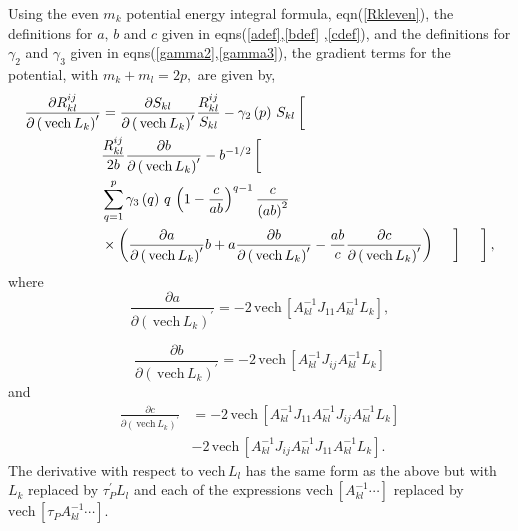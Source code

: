 \documentclass[12pt]{article}
\begin{document}
Using the even $m_{k}$ potential energy integral formula, eqn(\ref{Rkleven}),
the definitions for $a,\,b$ and $c$ given in eqns(\ref{adef},\ref{bdef}%
,\ref{cdef}), and the definitions for $\gamma_{2}$ and $\gamma_{3}$ given in
eqns(\ref{gamma2},\ref{gamma3}), the gradient terms for the potential, with
$m_{k}+m_{l}=2p,$ are given by,
\begin{align}
\frac{\partial R_{kl}^{ij}}{\partial\left(  \,\mathrm{vech}\,L_{k}\right)
^{\prime}} &  =\frac{\partial S_{kl}}{\partial\left(  \,\mathrm{vech}%
\,L_{k}\right)  ^{\prime}}\frac{R_{kl}^{ij}}{S_{kl}}-\gamma_{2}\left(
p\right)  \,S_{kl}\left[
\begin{array}
[c]{c}%
\,\\
\,
\end{array}
\right.  \nonumber\\
&  \frac{R_{kl}^{ij}}{2b}\frac{\partial b}{\partial\left(  \,\mathrm{vech}%
\,L_{k}\right)  ^{\prime}}-b^{-1/2}\left[
\begin{array}
[c]{c}%
\,\\
\,
\end{array}
\right.  \nonumber\\
&  \sum_{q=1}^{p}\gamma_{3}\left(  q\right)  \,q\,\left(  1-\frac{c}%
{ab}\right)  ^{q-1}\frac{c}{\left(  ab\right)  ^{2}}\nonumber\\
&  \times\left(  \frac{\partial a}{\partial\left(  \,\mathrm{vech}%
\,L_{k}\right)  ^{\prime}}b+a\frac{\partial b}{\partial\left(  \,\mathrm{vech}%
\,L_{k}\right)  ^{\prime}}-\frac{ab}{c}\frac{\partial c}{\partial\left(
\,\mathrm{vech}\,L_{k}\right)  ^{\prime}}\right)  \left.
\begin{array}
[c]{c}%
\,\\
\,
\end{array}
\right]  \left.
\begin{array}
[c]{c}%
\,\\
\,
\end{array}
\right]  ,
\end{align}
where
\begin{equation}
\frac{\partial a}{\partial\left(  \,\mathrm{vech}\,L_{k}\right)  ^{\prime}%
}=-2\,\mathrm{vech}\,\left[  A_{kl}^{-1}J_{11}A_{kl}^{-1}L_{k}\right]  ,
\end{equation}%

\begin{equation}
\frac{\partial b}{\partial\left(  \,\mathrm{vech}\,L_{k}\right)  ^{\prime}%
}=-2\,\mathrm{vech}\,\left[  A_{kl}^{-1}J_{ij}A_{kl}^{-1}L_{k}\right]
\end{equation}
and
\begin{align}
\frac{\partial c}{\partial\left(  \,\mathrm{vech}\,L_{k}\right)  ^{\prime}} &
=-2\,\mathrm{vech}\,\left[  A_{kl}^{-1}J_{11}A_{kl}^{-1}J_{ij}A_{kl}^{-1}%
L_{k}\right]  \nonumber\\
&  -2\,\mathrm{vech}\,\left[  A_{kl}^{-1}J_{ij}A_{kl}^{-1}J_{11}A_{kl}%
^{-1}L_{k}\right]  .
\end{align}
The derivative with respect to $\mathrm{vech}\,L_{l}$ has the same form as the
above but with $L_{k}$ replaced by $\tau_{P}^{\prime}L_{l}$ and each of the
expressions $\mathrm{vech}\,\left[  A_{kl}^{-1}\cdots\right]  $ replaced by
$\mathrm{vech}\,\left[  \tau_{P}A_{kl}^{-1}\cdots\right]  .$
\end{document}
